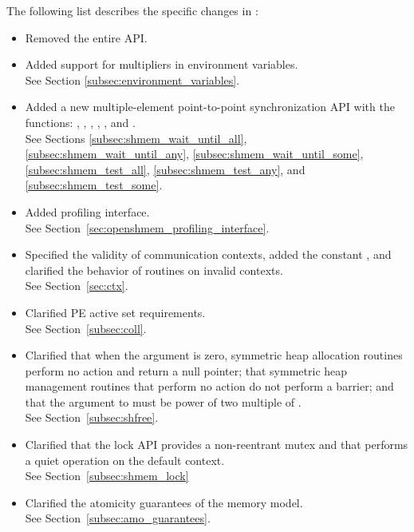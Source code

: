 The following list describes the specific changes in \openshmem[1.5]:
\begin{itemize}
%
\item Removed the entire \openshmem \Fortran API. 
%
\item Added support for multipliers in 
environment variables.
\\ See Section \ref{subsec:environment_variables}.
%
\item Added a new multiple-element point-to-point synchronization API with
  the functions: , ,
  , ,
  , and .
  \\See Sections \ref{subsec:shmem_wait_until_all},
  \ref{subsec:shmem_wait_until_any}, \ref{subsec:shmem_wait_until_some},
  \ref{subsec:shmem_test_all}, \ref{subsec:shmem_test_any}, and
  \ref{subsec:shmem_test_some}.
%
\item Added \openshmem profiling interface.
  \\ See Section~\ref{sec:openshmem_profiling_interface}.
%
\item Specified the validity of communication contexts, added the constant
  , and clarified the behavior of
   routines on invalid contexts.
  \\ See Section~\ref{sec:ctx}.
%
\item Clarified \ac{PE} active set requirements.
    \\See Section~\ref{subsec:coll}.
%
\item Clarified that when the  argument is zero, symmetric heap
    allocation routines perform no action and return a null pointer; that
    symmetric heap management routines that perform no action do not perform a
    barrier; and that the  argument to  must
    be power of two multiple of .
    \\See Section~\ref{subsec:shfree}.
%
\item Clarified that the \openshmem lock API provides a non-reentrant mutex and
    that  performs a quiet operation on the default
    context.
    \\See Section~\ref{subsec:shmem_lock}
%
\item Clarified the atomicity guarantees of the \openshmem memory model.
    \\See Section~\ref{subsec:amo_guarantees}.
%
\end{itemize}

